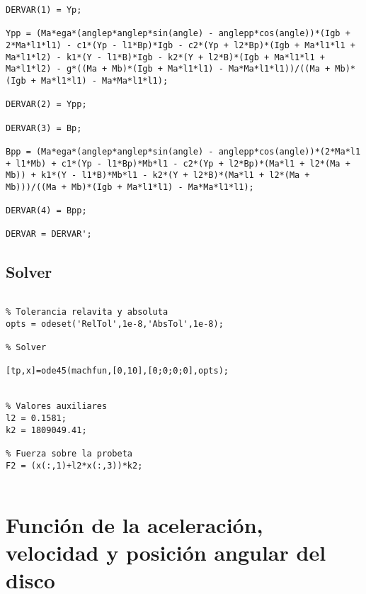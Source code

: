 \begin{lstlisting}
DERVAR(1) = Yp;

Ypp = (Ma*ega*(anglep*anglep*sin(angle) - anglepp*cos(angle))*(Igb + 2*Ma*l1*l1) - c1*(Yp - l1*Bp)*Igb - c2*(Yp + l2*Bp)*(Igb + Ma*l1*l1 + Ma*l1*l2) - k1*(Y - l1*B)*Igb - k2*(Y + l2*B)*(Igb + Ma*l1*l1 + Ma*l1*l2) - g*((Ma + Mb)*(Igb + Ma*l1*l1) - Ma*Ma*l1*l1))/((Ma + Mb)*(Igb + Ma*l1*l1) - Ma*Ma*l1*l1);

DERVAR(2) = Ypp;

DERVAR(3) = Bp;

Bpp = (Ma*ega*(anglep*anglep*sin(angle) - anglepp*cos(angle))*(2*Ma*l1 + l1*Mb) + c1*(Yp - l1*Bp)*Mb*l1 - c2*(Yp + l2*Bp)*(Ma*l1 + l2*(Ma + Mb)) + k1*(Y - l1*B)*Mb*l1 - k2*(Y + l2*B)*(Ma*l1 + l2*(Ma + Mb)))/((Ma + Mb)*(Igb + Ma*l1*l1) - Ma*Ma*l1*l1);

DERVAR(4) = Bpp;

DERVAR = DERVAR';

\end{lstlisting}


\subsection{Solver}
\label{sec:solver_part}

\begin{lstlisting}

% Tolerancia relavita y absoluta
opts = odeset('RelTol',1e-8,'AbsTol',1e-8);		

% Solver

[tp,x]=ode45(machfun,[0,10],[0;0;0;0],opts);


% Valores auxiliares
l2 = 0.1581;				
k2 = 1809049.41;			

% Fuerza sobre la probeta
F2 = (x(:,1)+l2*x(:,3))*k2;						


\end{lstlisting}

\section{Función de la aceleración, velocidad y posición angular del disco}
\label{sec:phi_fun}

